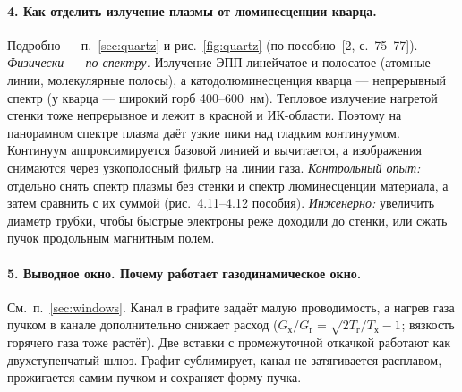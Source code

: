 \documentclass[12pt,a4paper]{article}
\begin{document}
\paragraph{4. Как отделить излучение плазмы от люминесценции кварца.}
Подробно --- п.~\ref{sec:quartz} и рис.~\ref{fig:quartz} (по
пособию~[2, с.~75--77]).
\textit{Физически --- по спектру.} Излучение ЭПП линейчатое и полосатое
(атомные линии, молекулярные полосы), а катодолюминесценция кварца ---
непрерывный спектр (у кварца --- широкий горб 400--600~нм). Тепловое
излучение нагретой стенки тоже непрерывное и лежит в красной и ИК-области.
Поэтому на панорамном спектре плазма даёт узкие пики над гладким
континуумом. Континуум аппроксимируется базовой линией и вычитается, а
изображения снимаются через узкополосный фильтр на линии газа.
\textit{Контрольный опыт:} отдельно снять спектр плазмы без стенки и
спектр люминесценции материала, а затем сравнить с их суммой
(рис.~4.11--4.12 пособия). \textit{Инженерно:} увеличить диаметр трубки,
чтобы быстрые электроны реже доходили до стенки, или сжать пучок
продольным магнитным полем.

\paragraph{5. Выводное окно. Почему работает газодинамическое окно.}
См.~п.~\ref{sec:windows}. Канал в графите задаёт малую проводимость, а нагрев газа
пучком в канале дополнительно снижает расход
($G_\text{х}/G_\text{г} = \sqrt{2T_\text{г}/T_\text{х}-1}$; вязкость
горячего газа тоже растёт). Две вставки с промежуточной откачкой
работают как двухступенчатый шлюз. Графит сублимирует, канал не
затягивается расплавом, прожигается самим пучком и сохраняет форму
пучка.
\end{document}
